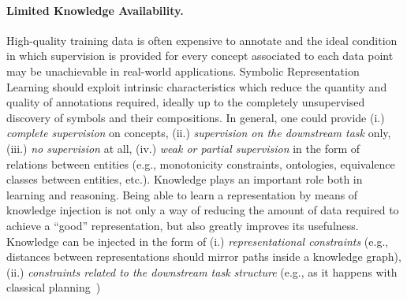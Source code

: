 \paragraph{Limited Knowledge Availability.}
High-quality training data is often expensive to annotate and the ideal condition in which supervision is provided for every concept associated to each data point may be unachievable in real-world applications. %
Symbolic Representation Learning should exploit intrinsic characteristics which reduce the quantity and quality of annotations required, ideally up to the completely unsupervised discovery of symbols and their compositions. %
In general, one could provide (i.) \textit{complete supervision} on concepts, (ii.) \textit{supervision on the downstream task} only, (iii.) \textit{no supervision} at all, (iv.) \textit{weak or partial supervision} in the form of relations between entities (e.g., monotonicity constraints, ontologies, equivalence classes between entities, etc.).
%
Knowledge plays an important role both in learning and reasoning. Being able to learn a representation by means of knowledge injection is not only a way of reducing the amount of data required to achieve a ``good'' representation, but also greatly improves its usefulness.
%
Knowledge can be injected in the form of (i.) \textit{representational constraints} (e.g.,
distances between representations should mirror paths inside a knowledge graph), (ii.) \textit{constraints related to the downstream task structure} (e.g., as it happens with classical planning~\cite{asai2018classical})
